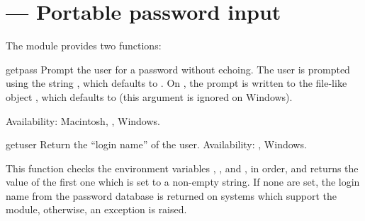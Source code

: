 \section{
         --- Portable password input}



The  module provides two functions:


\begin{funcdesc}{getpass}{}
  Prompt the user for a password without echoing.  The user is
  prompted using the string , which defaults to
  . On \UNIX, the prompt is written to the
  file-like object , which defaults to
   (this argument is ignored on Windows).

  Availability: Macintosh, \UNIX, Windows.
\end{funcdesc}


\begin{funcdesc}{getuser}{}
  Return the ``login name'' of the user.
  Availability: \UNIX, Windows.

  This function checks the environment variables ,
  ,  and , in order, and
  returns the value of the first one which is set to a non-empty
  string.  If none are set, the login name from the password database
  is returned on systems which support the  module,
  otherwise, an exception is raised.
\end{funcdesc}
